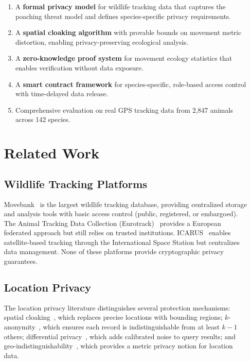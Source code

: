 \documentclass[11pt,letterpaper]{article}
\begin{document}
\begin{enumerate}[leftmargin=*]
    \item A \textbf{formal privacy model} for wildlife tracking data that captures the poaching threat model and defines species-specific privacy requirements.
    \item A \textbf{spatial cloaking algorithm} with provable bounds on movement metric distortion, enabling privacy-preserving ecological analysis.
    \item A \textbf{zero-knowledge proof system} for movement ecology statistics that enables verification without data exposure.
    \item A \textbf{smart contract framework} for species-specific, role-based access control with time-delayed data release.
    \item Comprehensive evaluation on real GPS tracking data from 2,847 animals across 142 species.
\end{enumerate}

\section{Related Work}

\subsection{Wildlife Tracking Platforms}

Movebank~\cite{movebank2024} is the largest wildlife tracking database, providing centralized storage and analysis tools with basic access control (public, registered, or embargoed). The Animal Tracking Data Collection (Eurotrack)~\cite{eurotrack2020} provides a European federated approach but still relies on trusted institutions. ICARUS~\cite{wikelski2007} enables satellite-based tracking through the International Space Station but centralizes data management. None of these platforms provide cryptographic privacy guarantees.

\subsection{Location Privacy}

The location privacy literature distinguishes several protection mechanisms: spatial cloaking~\cite{gruteser2003}, which replaces precise locations with bounding regions; $k$-anonymity~\cite{sweeney2002}, which ensures each record is indistinguishable from at least $k-1$ others; differential privacy~\cite{dwork2006}, which adds calibrated noise to query results; and geo-indistinguishability~\cite{andres2013}, which provides a metric privacy notion for location data.
\end{document}
